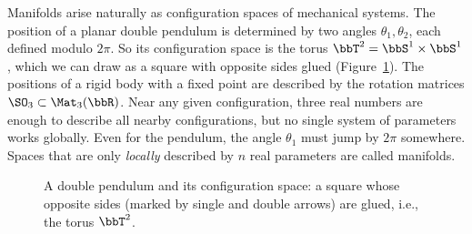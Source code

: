Manifolds arise naturally as configuration spaces of mechanical systems. The position of a planar double pendulum is determined by two angles $\theta_1,\theta_2$, each defined modulo $2\pi$. So its configuration space is the torus $\bbT^2=\bbS^1\times\bbS^1$, which we can draw as a square with opposite sides glued (Figure~\ref{fig double pendulum}). The positions of a rigid body with a fixed point are described by the rotation matrices $\SO_3\subset\Mat_3(\bbR)$. Near any given configuration, three real numbers are enough to describe all nearby configurations, but no single system of parameters works globally. Even for the pendulum, the angle $\theta_1$ must jump by $2\pi$ somewhere. Spaces that are only \emph{locally} described by $n$ real parameters are called manifolds.

\begin{figure}[tp]
    \centering
    \caption{A double pendulum and its configuration space: a square whose opposite sides (marked by single and double arrows) are glued, i.e., the torus $\bbT^2$.}
    \label{fig double pendulum}
\end{figure}

